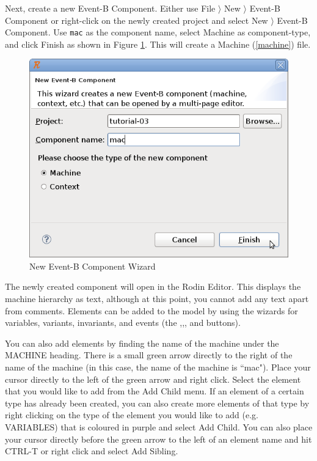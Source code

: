 
Next, create a new Event-B Component.  Either use \textsf{File $\rangle$ New $\rangle$ Event-B Component} or right-click on the newly created project and select \textsf{New $\rangle$ Event-B Component}.  Use \texttt{mac} as the component name, select \textsf{Machine} as component-type, and click \textsf{Finish} as shown in Figure \ref{fig_tut_03_new_component_wizard}. This will create a Machine (\ref{machine}) file.

\begin{figure}[!ht]
\begin{center}
	\includegraphics[]{img/tutorial/tut_03_mac.png}
	\caption{New Event-B Component Wizard}
	\label{fig_tut_03_new_component_wizard}
\end{center}
\end{figure}

The newly created component will open in the Rodin Editor. This displays the machine hierarchy as text, although at this point, you cannot add any text apart from comments. Elements can be added to the model by using the wizards for variables, variants, invariants, and events (the ,,, and  buttons). 

You can also add elements by finding the name of the machine under the MACHINE heading. There is a small green arrow directly to the right of the name of the machine (in this case, the name of the machine is ``mac"). Place your cursor directly to the left of the green arrow and right click. Select the element that you would like to add from the \textsf{Add Child} menu. If an element of a certain type has already been created, you can also create more elements of that type by right clicking on the type of the element you would like to add (e.g. \textsf{VARIABLES}) that is coloured in purple and select \textsf{Add Child}. You can also place your cursor directly before the green arrow  to the left of an element name and hit \textsf{CTRL-T} or right click and select \textsf{Add Sibling}.

